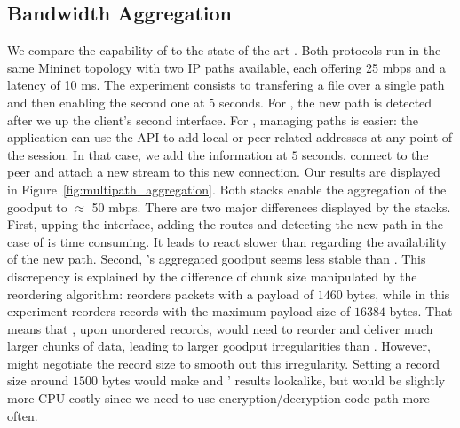 

\subsection{Bandwidth Aggregation}

We compare the capability of \tcpls to the state of the art \mptcp. Both
protocols run in the same Mininet topology with two IP paths available, each
offering 25 mbps and a latency of 10 ms. The experiment consists to transfering
a file over a single path and then enabling the second one at $5$ seconds. For
\mptcp, the new path is detected after we up the client's second interface. For
\tcpls, managing paths is easier: the application can use the API to add local
or peer-related addresses at any point of the session. In that case, we add
the information at $5$ seconds, connect to the peer and attach a new stream to
this new connection. Our results are displayed in
Figure~\ref{fig:multipath_aggregation}. Both stacks enable the aggregation of the
goodput to  $\approx$ 50 mbps. There are two major differences displayed by the stacks.
First, upping the interface, adding the routes and detecting the new path in
the case of \mptcp is time consuming. It leads \mptcp to react slower than
\tcpls regarding the availability of the new path. Second, \tcpls's aggregated
goodput seems less stable than \mptcp. This discrepency is explained by the
difference of chunk size manipulated by the reordering algorithm: \mptcp
reorders packets with a payload of $1460$ bytes, while \tcpls in this experiment
reorders records with the maximum payload size of $16384$ bytes. That means
that \tcpls, upon unordered records, would need to reorder and deliver much
larger chunks of data, leading to larger goodput irregularities than \mptcp.
However, \tcpls might  negotiate the record size to smooth out this
irregularity. Setting a record size around $1500$ bytes would make \mptcp and
\tcpls' results lookalike, but would be slightly more CPU costly since we need
to use encryption/decryption code path more often.

